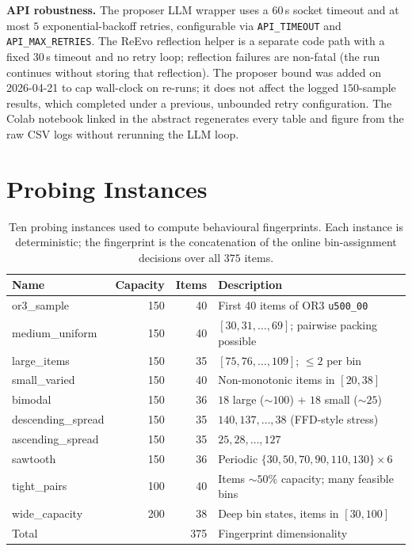 \documentclass{article}
\begin{document}
\textbf{API robustness.} The proposer LLM wrapper uses a $60$\,s socket
timeout and at most $5$ exponential-backoff retries, configurable via
\texttt{API\_TIMEOUT} and \texttt{API\_MAX\_RETRIES}. The ReEvo reflection
helper is a separate code path with a fixed $30$\,s timeout and no retry
loop; reflection failures are non-fatal (the run continues without storing
that reflection). The proposer bound was added on 2026-04-21 to cap
wall-clock on re-runs; it does not affect the logged $150$-sample results,
which completed under a previous, unbounded retry configuration. The Colab notebook linked in the abstract regenerates every
table and figure from the raw CSV logs without rerunning the LLM loop.

\section{Probing Instances}
\label{app:probes}

\begin{table}[H]
\centering\small
\begin{tabular}{@{}lrrl@{}}
\toprule
Name & Capacity & Items & Description \\
\midrule
or3\_sample        & 150 & 40 & First 40 items of OR3 \texttt{u500\_00} \\
medium\_uniform    & 150 & 40 & $[30,31,\dots,69]$; pairwise packing possible \\
large\_items       & 150 & 35 & $[75,76,\dots,109]$; $\le 2$ per bin \\
small\_varied      & 150 & 40 & Non-monotonic items in $[20,38]$ \\
bimodal            & 150 & 36 & $18$ large ($\sim 100$) + $18$ small ($\sim 25$) \\
descending\_spread & 150 & 35 & $140,137,\dots,38$ (FFD-style stress) \\
ascending\_spread  & 150 & 35 & $25,28,\dots,127$ \\
sawtooth           & 150 & 36 & Periodic $\{30,50,70,90,110,130\}\times 6$ \\
tight\_pairs       & 100 & 40 & Items $\sim 50\%$ capacity; many feasible bins \\
wide\_capacity     & 200 & 38 & Deep bin states, items in $[30,100]$ \\
\midrule
Total              &     & 375 & Fingerprint dimensionality \\
\bottomrule
\end{tabular}
\caption{Ten probing instances used to compute behavioural fingerprints. Each
instance is deterministic; the fingerprint is the concatenation of the online
bin-assignment decisions over all $375$ items.}
\label{tab:probes}
\end{table}
\end{document}
